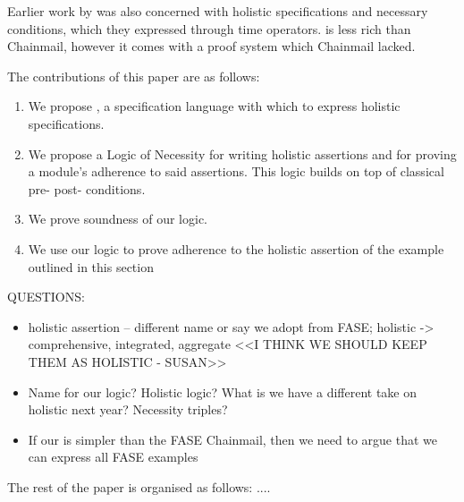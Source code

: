 Earlier work by \citeauthor{FASE} was also concerned with 
 holistic specifications and necessary conditions, which they expressed through time operators.
 \Chainmail is less rich than Chainmail, however it comes with a proof system which Chainmail lacked.
 
  
 The contributions of this paper are as follows:
 
 \begin{enumerate}
 \item
 We propose \Chainmail, a specification language with which to
express holistic specifications. 
 \item
 We propose a Logic of Necessity for writing holistic assertions and for proving a module's adherence to said assertions.
 This logic builds on top of classical pre- post- conditions.
 \item
 We prove soundness of our logic.  
 \item
 We use our logic to prove adherence to the holistic assertion of the example
outlined  in this section
 \end{enumerate}
 
 QUESTIONS:
 \begin{itemize}
 \item
 holistic assertion -- different name or say we adopt from FASE; holistic -> comprehensive, integrated, aggregate <<I THINK WE SHOULD KEEP THEM AS HOLISTIC  - SUSAN>>
 \item
 Name for our logic?  Holistic logic? What is we have a different take on holistic next year? Necessity triples? 
\item
If our \Chainmail is simpler than the FASE Chainmail, then we need to argue that we can express all FASE examples
 \end{itemize}
  
The rest of the paper is organised as follows: .... 

